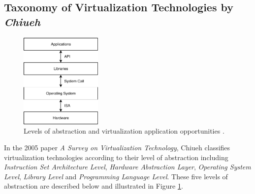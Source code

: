 	\subsection{Taxonomy of Virtualization Technologies by \textit{Chiueh}}
	\begin{figure}[H]
		\centering
		\includegraphics[width=4cm]{images/Chiueh2005.pdf}
		\vspace{-0.2cm}
		\caption{Levels of abstraction and virtualization application opportunities \cite{Chiueh2005}.}
		\label{fig:VirtualizationOpportunities}
	\end{figure}
	
	In the 2005 paper \textit{A Survey on Virtualization Technology}, Chiueh classifies virtualization technologies according to their level of abstraction \cite{Chiueh2005} including  \textit{Instruction Set Architecture Level}, \textit{Hardware Abstraction Layer}, \textit{Operating System Level}, \textit{Library Level} and \textit{Programming Language Level}. These five levels of abstraction are described below and illustrated in  Figure \ref{fig:VirtualizationOpportunities}. 
	
